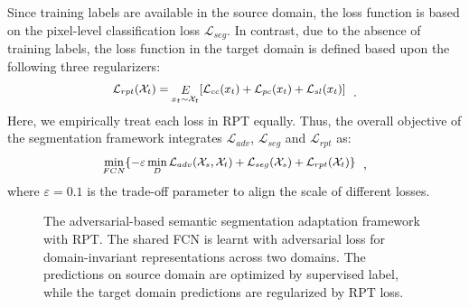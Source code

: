 \documentclass[10pt,twocolumn,letterpaper]{article}
\begin{document}
Since training labels are available in the source domain, the loss function is based on the pixel-level classification loss $\mathcal{L}_{seg}$. In contrast, due to the absence of training labels, the loss function in the target domain is defined based upon the following three regularizers:
\begin{equation}
   \label{eq:rpt}
   \small
   \begin{aligned}
   \mathcal{L}_{rpt}(\mathcal{X}_{t})= \mathop{E}\limits_{x_t \sim \mathcal{X}_t}[\mathcal{L}_{cc}(x_t)+\mathcal{L}_{pc}(x_t)+\mathcal{L}_{sl}(x_t)]
   \end{aligned}~~.
\end{equation}
Here, we empirically treat each loss in RPT equally. Thus, the overall objective of the segmentation framework integrates $\mathcal{L}_{adv}$, $\mathcal{L}_{seg}$ and $\mathcal{L}_{rpt}$ as:
\begin{equation}
   \label{eq:all}
   \small
   \begin{aligned}
   \mathop{\min}_{FCN}\{-\varepsilon \mathop{\min}_{D}\mathcal{L}_{adv}(\mathcal{X}_s, \mathcal{X}_t) + \mathcal{L}_{seg}(\mathcal{X}_s) + \mathcal{L}_{rpt}(\mathcal{X}_t)\}
   \end{aligned}~~,
\end{equation}
where $\varepsilon=0.1$ is the trade-off parameter to align the scale of different losses.
\begin{figure}[!tb]
   \vspace{-0.05in}
   \caption{\small The adversarial-based semantic segmentation adaptation framework with RPT. The shared FCN is learnt with adversarial loss for domain-invariant representations across two domains. The predictions on source domain are optimized by supervised label, while the target domain predictions are regularized by RPT loss.}
   \label{fig:framework}
   \vspace{-0.15in}
\end{figure}
\end{document}
